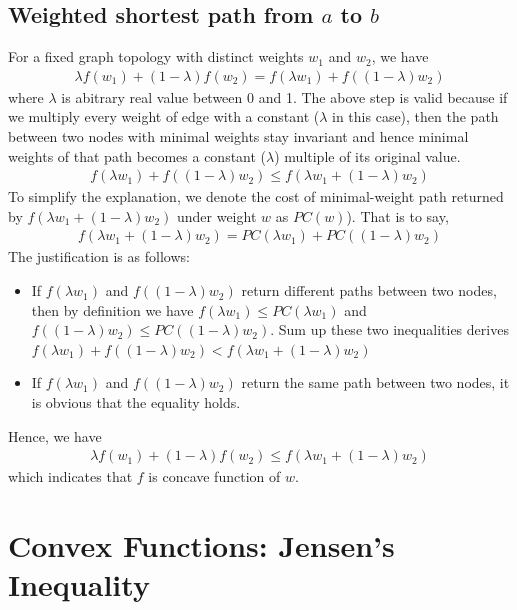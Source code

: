 \documentclass[11pt,a4paper]{article}
\begin{document}
\subsection{Weighted shortest path from $a$ to $b$}
For a fixed graph topology with distinct weights $w_1$ and $w_2$, we have
\begin{align}
    \lambda f(w_1) + (1-\lambda) f(w_2)
    = f(\lambda w_1) + f((1-\lambda) w_2)
\end{align}
where $\lambda$ is abitrary real value between 0 and 1. The above step is valid
because if we multiply every weight of edge with a constant ($\lambda$ in this
case), then the path between two nodes with minimal weights stay invariant and
hence minimal weights of that path becomes a constant ($\lambda$) multiple of
its original value.
\begin{align}
    f(\lambda w_1) + f((1-\lambda) w_2)
    \leq f(\lambda w_1 + (1-\lambda) w_2)  
\end{align}
    To simplify the explanation, we denote the cost of minimal-weight path
    returned by $f(\lambda w_1 + (1-\lambda) w_2)$ under weight $w$ as
    $PC(w)$). That is to say,  
\begin{align}
    f(\lambda w_1 + (1-\lambda) w_2) = PC(\lambda w_1) + PC((1-\lambda) w_2)
\end{align}
    The justification is as follows:
\begin{itemize}
    \item If $f(\lambda w_1)$ and $f((1-\lambda) w_2)$ return different
        paths between two nodes,  then by definition we have
        $f(\lambda w_1) \leq PC(\lambda w_1)$ and 
        $f((1-\lambda) w_2) \leq PC((1-\lambda) w_2)$. Sum up these two
        inequalities derives $f(\lambda w_1) + f((1-\lambda) w_2) < f(\lambda w_1 + (1-\lambda) w_2)$
    \item If $f(\lambda w_1)$ and $f((1-\lambda) w_2)$ return the same path
        between two nodes, it is obvious that the equality holds.
\end{itemize}
Hence, we have 
\begin{align}
    \lambda f(w_1) + (1-\lambda) f(w_2)
    \leq f(\lambda w_1 + (1-\lambda) w_2)  
\end{align}
which indicates that $f$ is concave function of $w$.

\newpage
\section{Convex Functions: Jensen's Inequality}
\end{document}
